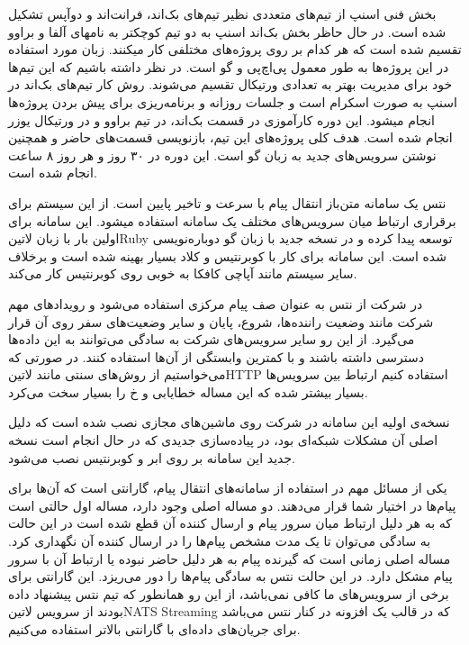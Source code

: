 \documentclass[a4]{report}
\begin{document}
بخش فنی اسنپ از تیم‌های متعددی نظیر تیم‌های بک‌اند، فرانت‌اند و دوآپس
تشکیل شده است. در حال حاظر بخش بک‌اند اسنپ به دو تیم کوچکتر به نامهای آلفا و براوو تقسیم شده است که هر کدام بر روی پروژه‌های مختلفی کار میکنند. زبان مورد استفاده در این پروژه‌ها به طور معمول پی‌اچ‌پی و گو است.
در نظر داشته باشیم که این تیم‌ها خود برای مدیریت بهتر به تعدادی ورتیکال تقسیم می‌شوند.
روش کار تیم‌های بک‌اند در اسنپ به صورت اسکرام است و جلسات روزانه و برنامه‌ریزی برای پیش بردن پروژه‌ها انجام میشود.
این دوره کارآموزی در قسمت بک‌اند، در تیم براوو و در ورتیکال یوزر انجام شده است. هدف کلی پروژه‌های این تیم، بازنویسی
قسمت‌های حاضر و همچنین نوشتن سرویس‌های جدید به زبان گو است. این دوره در ۳۰ روز و هر روز ۸ ساعت انجام شده است.

نتس یک سامانه متن‌باز انتقال پیام با سرعت و تاخیر پایین است. از این سیستم برای برقراری ارتباط میان سرویس‌های مختلف یک سامانه استفاده میشود.
این سامانه برای اولین بار با زبان ‌لاتین{Ruby} توسعه پیدا کرده و در نسخه جدید با زبان گو دوباره‌نویسی شده است. این سامانه برای کار با کوبرنتیس و کلاد بسیار بهینه شده است
و برخلاف سایر سیستم مانند آپاچی کافکا به خوبی روی کوبرنتیس کار می‌کند.

در شرکت از نتس به عنوان صف پیام مرکزی استفاده می‌شود و رویدادهای مهم شرکت مانند وضعیت راننده‌ها، شروع، پایان و سایر وضعیت‌های سفر روی آن قرار می‌گیرد.
از این رو سایر سرویس‌های شرکت به سادگی می‌توانند به این داده‌ها دسترسی داشته باشند و با کمترین وابستگی از آن‌ها استفاده ‌کنند. در صورتی که می‌خواستیم از روش‌های سنتی مانند ‌لاتین{HTTP}
استفاده کنیم ارتباط بین سرویس‌ها بسیار بیشتر شده که این مساله خطایابی و ‌خ را بسیار سخت می‌کرد.

نسخه‌ی اولیه این سامانه در شرکت روی ماشین‌های مجازی نصب شده است که دلیل اصلی آن مشکلات شبکه‌ای بود، در پیاده‌سازی جدیدی که در حال انجام است نسخه جدید این سامانه بر روی ابر و کوبرنتیس نصب می‌شود.

یکی از مسائل مهم در استفاده از سامانه‌های انتقال پیام، گارانتی است که آن‌ها برای پیام‌ها در اختیار شما قرار می‌دهند. دو مساله اصلی وجود دارد، مساله اول حالتی است که به هر دلیل ارتباط میان سرور پیام و ارسال کننده آن قطع شده است
در این حالت به سادگی می‌توان تا یک مدت مشخص پیام‌ها را در ارسال کننده آن نگهداری کرد. مساله اصلی زمانی است که گیرنده پیام به هر دلیل حاضر نبوده یا ارتباط آن با سرور پیام مشکل دارد. در این حالت نتس به سادگی پیام‌ها را دور می‌ریزد.
این گارانتی برای برخی از سرویس‌های ما کافی نمی‌باشد، از این رو همانطور که تیم نتس پیشنهاد داده بودند از سرویس ‌لاتین{NATS Streaming} که در قالب یک افزونه در کنار نتس می‌باشد برای جریان‌های داده‌ای با گارانتی بالاتر استفاده می‌کنیم.
\end{document}
